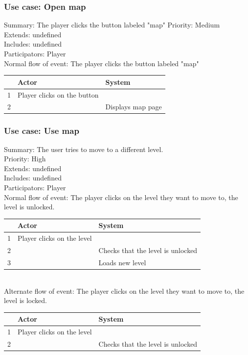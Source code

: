 \documentclass{article}
\begin{document}
\subsubsection{Use case: Open map}
Summary: The player clicks the button labeled "map"
Priority: Medium \\
Extends: undefined\\
Includes: undefined\\
Participators: Player \\
Normal flow of event: The player clicks the button labeled "map"\\
\begin{tabular}{|c|l|l|} \hline
      & Actor & System \\ \hline
    1 & Player clicks on the button & \\ \hline
    2 & & Displays map page \\ \hline
\end{tabular} 

\subsubsection{Use case: Use map}
Summary: The user tries to move to a different level.\\
Priority: High\\
Extends: undefined\\
Includes: undefined\\
Participators: Player \\
Normal flow of event: The player clicks on the level they want to move to, the level is unlocked.\\
\begin{tabular}{|c|l|l|} \hline
      & Actor & System \\ \hline
    1 & Player clicks on the level & \\ \hline
    2 & & Checks that the level is unlocked \\ \hline
    3 & & Loads new level \\ \hline
\end{tabular} \\
Alternate flow of event: The player clicks on the level they want to move to, the level is locked.\\
\begin{tabular}{|c|l|l|} \hline
      & Actor & System \\ \hline
    1 & Player clicks on the level & \\ \hline
    2 & & Checks that the level is unlocked \\ \hline
\end{tabular} 
\end{document}
